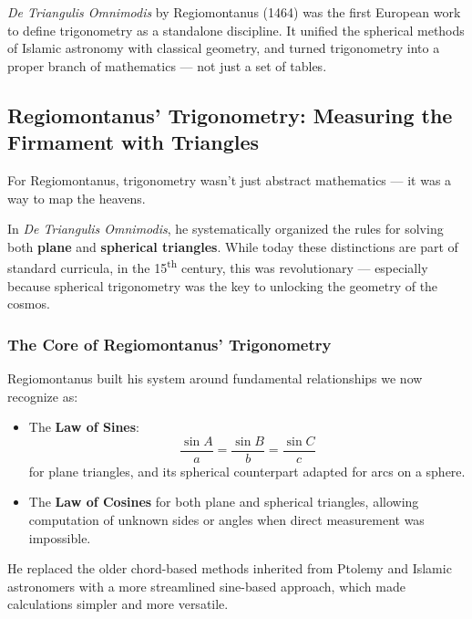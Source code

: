 \begin{tcolorbox}[colback=gray!5!white, colframe=black, title=\textbf{TL;DR: The First Book of Trigonometry}, fonttitle=\bfseries, arc=1.5mm, boxrule=0.4pt]
\textit{De Triangulis Omnimodis} by Regiomontanus (1464) was the first European work to define trigonometry as a standalone discipline.  
It unified the spherical methods of Islamic astronomy with classical geometry, and turned trigonometry into a proper branch of mathematics — not just a set of tables.
\end{tcolorbox}



\subsection{Regiomontanus’ Trigonometry: Measuring the Firmament with Triangles}

For Regiomontanus, trigonometry wasn’t just abstract mathematics — it was a way to map the heavens.

In \textit{De Triangulis Omnimodis}, he systematically organized the rules for solving both \textbf{plane} and \textbf{spherical triangles}. While today these distinctions are part of standard curricula, in the 15\textsuperscript{th} century, this was revolutionary — especially because spherical trigonometry was the key to unlocking the geometry of the cosmos.

\subsubsection*{The Core of Regiomontanus’ Trigonometry}

Regiomontanus built his system around fundamental relationships we now recognize as:

\begin{itemize}
  \item The \textbf{Law of Sines}:
  \[
  \frac{\sin A}{a} = \frac{\sin B}{b} = \frac{\sin C}{c}
  \]
  for plane triangles, and its spherical counterpart adapted for arcs on a sphere.
  
  \item The \textbf{Law of Cosines} for both plane and spherical triangles, allowing computation of unknown sides or angles when direct measurement was impossible.
\end{itemize}

He replaced the older chord-based methods inherited from Ptolemy and Islamic astronomers with a more streamlined sine-based approach, which made calculations simpler and more versatile.

